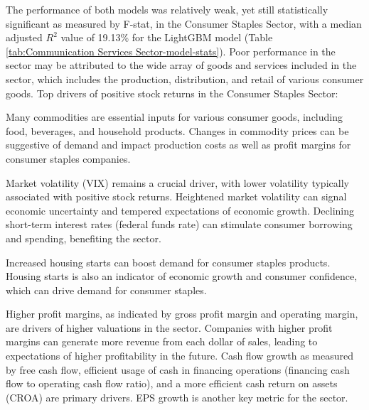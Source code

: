 \documentclass[12pt,a4paper,english]{article}
\begin{document}
The performance of both models was relatively weak, yet still statistically significant as measured by F-stat, in the Consumer Staples Sector, with a median adjusted $R^2$ value of 19.13\% for the LightGBM model (Table \ref{tab:Communication Services Sector-model-stats}). Poor performance in the sector may be attributed to the wide array of goods and services included in the sector, which includes the production, distribution, and retail of various consumer goods. Top drivers of positive stock returns in the Consumer Staples Sector:


Many commodities are essential inputs for various consumer goods, including food, beverages, and household products. Changes in commodity prices can be suggestive of demand and impact production costs as well as profit margins for consumer staples companies.

Market volatility (VIX) remains a crucial driver, with lower volatility typically associated with positive stock returns. Heightened market volatility can signal economic uncertainty and tempered expectations of economic growth. Declining short-term interest rates (federal funds rate) can stimulate consumer borrowing and spending, benefiting the sector.

Increased housing starts can boost demand for consumer staples products. Housing starts is also an indicator of economic growth and consumer confidence, which can drive demand for consumer staples.

Higher profit margins, as indicated by gross profit margin and operating margin, are drivers of higher valuations in the sector. Companies with higher profit margins can generate more revenue from each dollar of sales, leading to expectations of higher profitability in the future. Cash flow growth as measured by free cash flow, efficient usage of cash in financing operations (financing cash flow to operating cash flow ratio), and a more efficient cash return on assets (CROA) are primary drivers. EPS growth is another key metric for the sector.
\end{document}

